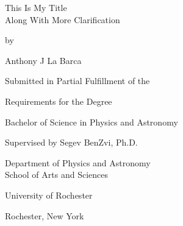 \begin{titlepage}
  \vspace*{\fill}

  \begin{center}
    {\Huge This Is My Title\\ Along With More Clarification\par
    }

    \bigskip%
    by

    \bigskip%
    Anthony J La Barca


    \bigskip\bigskip\bigskip\bigskip%
    Submitted in Partial Fulfillment of the

    \bigskip%
    Requirements for the Degree

    \bigskip%
    Bachelor of Science in Physics and Astronomy


    \bigskip\bigskip\bigskip\bigskip%
    Supervised by Segev BenZvi, Ph.D.

    \bigskip\bigskip%
    Department of Physics and Astronomy\\
    School of Arts and Sciences


    \bigskip\bigskip\bigskip\bigskip%
    University of Rochester

    \bigskip%
    Rochester, New York


    \bigskip\bigskip\bigskip{}
  \end{center}

  \vspace*{\fill}
\end{titlepage}
